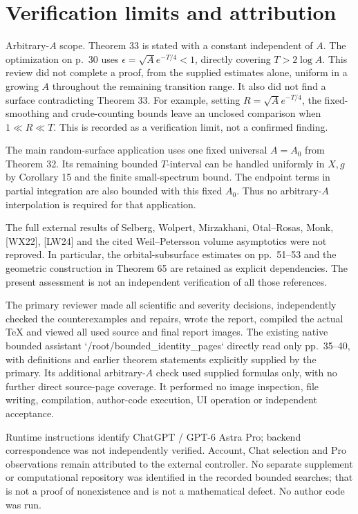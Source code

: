 \documentclass[10pt]{article}
\begin{document}
\section*{Verification limits and attribution}
Arbitrary-\(A\) scope. Theorem 33 is stated with a constant independent of \(A\). The optimization on p. 30 uses \(\epsilon=\sqrt A e^{-T/4}<1\), directly covering \(T>2\log A\). This review did not complete a proof, from the supplied estimates alone, uniform in a growing \(A\) throughout the remaining transition range. It also did not find a surface contradicting Theorem 33. For example, setting \(R=\sqrt A e^{-T/4}\), the fixed-smoothing and crude-counting bounds leave an unclosed comparison when \(1\ll R\ll T\). This is recorded as a verification limit, not a confirmed finding.\par
The main random-surface application uses one fixed universal \(A=A_0\) from Theorem 32. Its remaining bounded \(T\)-interval can be handled uniformly in \(X,g\) by Corollary 15 and the finite small-spectrum bound. The endpoint terms in partial integration are also bounded with this fixed \(A_0\). Thus no arbitrary-\(A\) interpolation is required for that application.\par
The full external results of Selberg, Wolpert, Mirzakhani, Otal–Rosas, Monk, [WX22], [LW24] and the cited Weil–Petersson volume asymptotics were not reproved. In particular, the orbital-subsurface estimates on pp. 51–53 and the geometric construction in Theorem 65 are retained as explicit dependencies. The present assessment is not an independent verification of all those references.\par
The primary reviewer made all scientific and severity decisions, independently checked the counterexamples and repairs, wrote the report, compiled the actual TeX and viewed all used source and final report images. The existing native bounded assistant `/root/bounded\_identity\_pages` directly read only pp. 35–40, with definitions and earlier theorem statements explicitly supplied by the primary. Its additional arbitrary-\(A\) check used supplied formulas only, with no further direct source-page coverage. It performed no image inspection, file writing, compilation, author-code execution, UI operation or independent acceptance.\par
Runtime instructions identify ChatGPT / GPT-6 Astra Pro; backend correspondence was not independently verified. Account, Chat selection and Pro observations remain attributed to the external controller. No separate supplement or computational repository was identified in the recorded bounded searches; that is not a proof of nonexistence and is not a mathematical defect. No author code was run.\par
\end{document}
